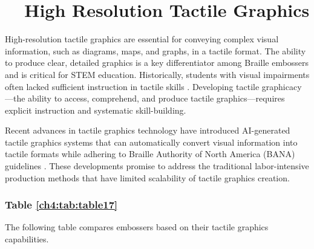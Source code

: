 \section{~~High Resolution Tactile Graphics}\label{ch4:sec:tactile-graphics}

High-resolution tactile graphics are essential for conveying complex visual information, such as diagrams, maps, and graphs, in a tactile format. The ability to produce clear, detailed graphics is a key differentiator among Braille embossers and is critical for STEM education.\supercite{NYUMaps, TouchMapper} Historically, students with visual impairments often lacked sufficient instruction in tactile skills \supercite{TactileSkillsDevelopment}. Developing tactile graphicacy—the ability to access, comprehend, and produce tactile graphics—requires explicit instruction and systematic skill-building.

Recent advances in tactile graphics technology have introduced AI-generated tactile graphics systems that can automatically convert visual information into tactile formats while adhering to Braille Authority of North America (BANA) guidelines \supercite{BrailleMathCodes, BANA}. These developments promise to address the traditional labor-intensive production methods that have limited scalability of tactile graphics creation.\supercite{ASUImageGen, BlindSVG}

\subsubsection{Table \ref{ch4:tab:table17}}
The following table compares embossers based on their tactile graphics capabilities.

